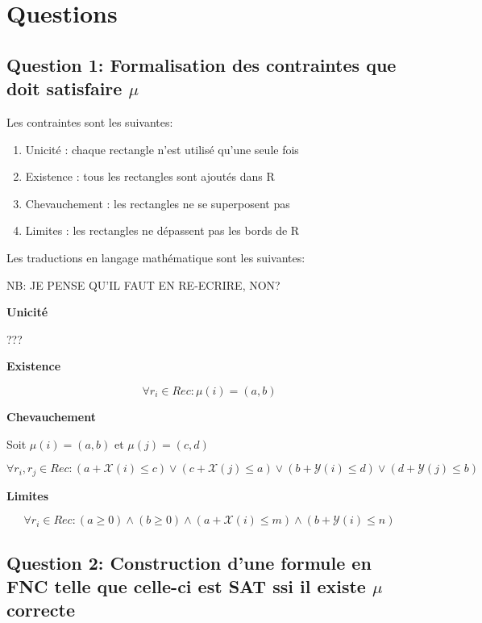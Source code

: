 \documentclass[a4paper,10pt]{article}
\begin{document}
\section{Questions}

\subsection{Question 1: Formalisation des contraintes que doit satisfaire $\mu$}

Les contraintes sont les suivantes: 

\begin{enumerate}
\item Unicité : chaque rectangle n'est utilisé qu'une seule fois
\item Existence : tous les rectangles sont ajoutés dans R
\item Chevauchement : les rectangles ne se superposent pas
\item Limites : les rectangles ne dépassent pas les bords de R
\end{enumerate}

Les traductions en langage mathématique sont les suivantes:

NB: JE PENSE QU'IL FAUT EN RE-ECRIRE, NON?

\textbf{Unicité}

???

\textbf{Existence}

\begin{equation}
\label{eq:existence}
\forall r_i \in Rec : \mu(i) = (a,b)
\end{equation}

\textbf{Chevauchement}

Soit $\mu(i) = (a,b)$ et $\mu(j) = (c,d)$

\begin{equation}
\label{eq:chevauchement}
\forall r_i,r_j \in Rec : (a + \mathcal{X}(i) \leq c) \lor (c + \mathcal{X}(j) \leq a) \lor (b + \mathcal{Y}(i) \leq d) \lor (d + \mathcal{Y}(j) \leq b)
\end{equation}

\textbf{Limites}

\begin{equation}
\label{eq:limites}
\forall r_i \in Rec : (a \geq 0) \land (b \geq 0) \land (a+\mathcal{X}(i) \leq m) \land (b + \mathcal{Y}(i) \leq n)
\end{equation}

\newpage

\subsection{Question 2: Construction d'une formule en FNC telle que celle-ci est SAT ssi il existe $\mu$ correcte}
\end{document}
